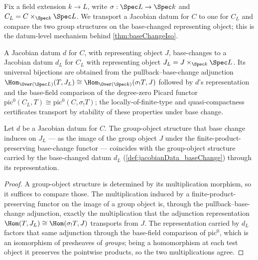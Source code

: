Fix a field extension \(k \to L\), write \(\sigma : \Spec L \to \Spec k\) and
\(C_L = C \times_{\Spec k} \Spec L\). We transport a Jacobian datum for \(C\) to one for
\(C_L\) and compare the two group structures on the base-changed representing object; this is the
datum-level mechanism behind \ref{thm:baseChangeIso}.

\begin{definition}
  \label{def:jacobianData_baseChange}
  \leanok
  A Jacobian datum \(d\) for \(C\), with representing object \(J\), base-changes to a Jacobian datum
  \(d_L\) for \(C_L\) with representing object \(J_L = J \times_{\Spec k} \Spec L\). Its universal
  bijections are obtained from the pullback--base-change adjunction
  \(\Hom_{\Over(\Spec L)}(T, J_L) \cong \Hom_{\Over(\Spec k)}(\sigma_! T, J)\) followed by \(d\)'s
  representation and the base-field comparison of the degree-zero Picard functor
  \(\mathrm{pic}^0(C_L, T) \cong \mathrm{pic}^0(C, \sigma_! T)\); the locally-of-finite-type and
  quasi-compactness certificates transport by stability of these properties under base change.
\end{definition}

\begin{lemma}
  \label{lem:grpObjObj_baseChange_eq}
  \leanok
  Let \(d\) be a Jacobian datum for \(C\). The group-object structure that base change induces on
  \(J_L\) --- as the image of the group object \(J\) under the finite-product-preserving base-change
  functor --- coincides with the group-object structure carried by the base-changed datum \(d_L\)
  (\ref{def:jacobianData_baseChange}) through its representation.
\end{lemma}
\begin{proof}
  \leanok
  A group-object structure is determined by its multiplication morphism, so it suffices to compare
  those. The multiplication induced by a finite-product-preserving functor on the image of a group
  object is, through the pullback--base-change adjunction, exactly the multiplication that the
  adjunction representation \(\Hom(T, J_L) \cong \Hom(\sigma_! T, J)\) transports from \(J\). The
  representation carried by \(d_L\) factors that same adjunction through the base-field comparison of
  \(\mathrm{pic}^0\), which is an isomorphism of presheaves of \emph{groups}; being a homomorphism at
  each test object it preserves the pointwise products, so the two multiplications agree.
\end{proof}

